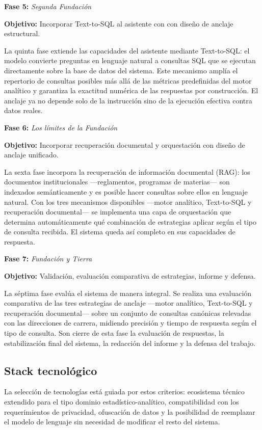 \documentclass[
  spanish,
]{article}
\begin{document}
\textbf{Fase 5:} \emph{Segunda Fundación}

\textbf{Objetivo:} Incorporar Text-to-SQL al asistente con con diseño de anclaje estructural.

La quinta fase extiende las capacidades del asistente mediante Text-to-SQL:
el modelo convierte preguntas en lenguaje natural a consultas SQL que se ejecutan
directamente sobre la base de datos del sistema.
Este mecanismo amplía el repertorio de consultas posibles más allá de las métricas predefinidas
del motor analítico y garantiza la exactitud numérica de las respuestas por construcción.
El anclaje ya no depende solo de la instrucción sino de la ejecución efectiva contra datos reales.

\textbf{Fase 6:} \emph{Los límites de la Fundación}

\textbf{Objetivo:} Incorporar recuperación documental y orquestación con diseño de anclaje unificado.

La sexta fase incorpora la recuperación de información documental (RAG):
los documentos institucionales ---reglamentos, programas de materias--- son indexados semánticamente
y es posible hacer consultas sobre ellos en lenguaje natural.
Con los tres mecanismos disponibles ---motor analítico, Text-to-SQL y recuperación documental---
se implementa una capa de orquestación que determina automáticamente qué combinación de estrategias
aplicar según el tipo de consulta recibida.
El sistema queda así completo en sus capacidades de respuesta.

\textbf{Fase 7:} \emph{Fundación y Tierra}

\textbf{Objetivo:} Validación, evaluación comparativa de estrategias, informe y defensa.

La séptima fase evalúa el sistema de manera integral.
Se realiza una evaluación comparativa de las tres estrategias de anclaje
---motor analítico, Text-to-SQL y recuperación documental---
sobre un conjunto de consultas canónicas relevadas con las direcciones de carrera,
midiendo precisión y tiempo de respuesta según el tipo de consulta.
Son cierre de esta fase la evaluación de respuestas, la estabilización final del sistema,
la redacción del informe y la defensa del trabajo.


\subsection{Stack tecnológico}\label{stack-tecnologico-principal}

La selección de tecnologías está
guiada por estos criterios: ecosistema técnico extendido para el tipo dominio
estadístico-analítico, compatibilidad con los requerimientos de
privacidad, ofuscación de datos y la posibilidad de reemplazar el modelo
de lenguaje sin necesidad de modificar el resto del sistema.
\end{document}
